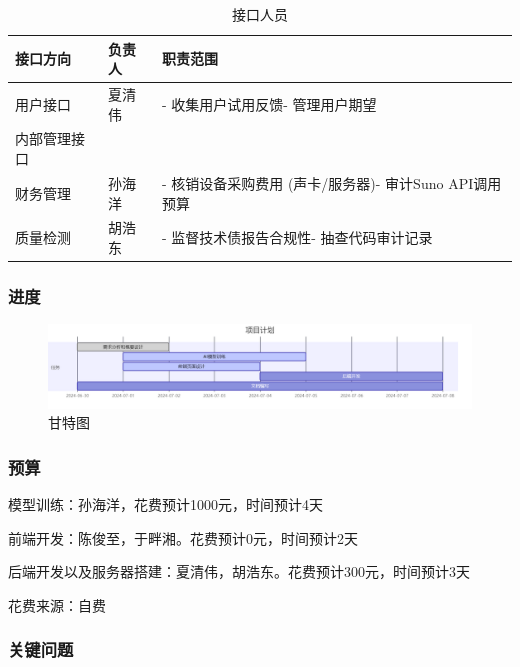 \documentclass{base}
\numberwithin{figure}{section} %
\begin{document}
\begin{longtable}{@{}lll@{}}
\caption{接口人员}
\label{tab:my-table}\\
\toprule
\textbf{接口方向} & \textbf{负责人} & \textbf{职责范围}                       \\* \midrule
\endhead
%
\bottomrule
\endfoot
%
\endlastfoot
%
用户接口          & 夏清伟          & - 收集用户试用反馈- 管理用户期望                  \\
内部管理接口        &              &                                     \\
财务管理          & 孙海洋          & - 核销设备采购费用 (声卡/服务器)- 审计Suno API调用预算 \\
质量检测          & 胡浩东          & - 监督技术债报告合规性- 抽查代码审计记录              \\* \bottomrule
\end{longtable}

\subsubsection{进度}

\begin{figure}[H]
    \centering
    \includegraphics[width=\textwidth]{images/3-1.png}
    \caption{甘特图}
    \label{fig:gantt-chart}
\end{figure}

\subsubsection{预算}

模型训练：孙海洋，花费预计1000元，时间预计4天

前端开发：陈俊至，于畔湘。花费预计0元，时间预计2天

后端开发以及服务器搭建：夏清伟，胡浩东。花费预计300元，时间预计3天

花费来源：自费

\subsubsection{关键问题}
\end{document}
